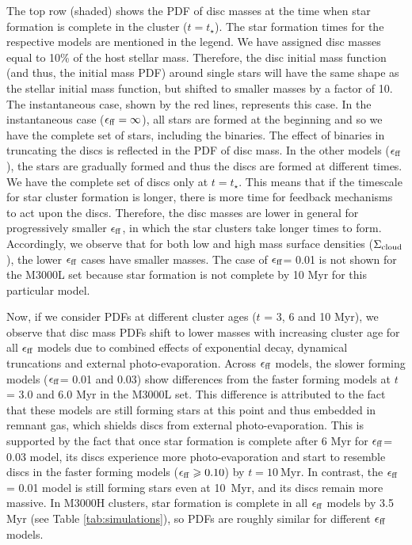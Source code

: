 \documentclass[fleqn,usenatbib]{mnras}
\newcommand\sfeff{\ensuremath{\epsilon_{\rm ff}}\xspace}   %
\newcommand\Sigmacloud{\ensuremath{\Sigma_{\rm cloud}}\xspace} %
\begin{document}
The top row (shaded) shows the PDF of disc masses at the time when star formation is complete in the cluster ($t=t_\star$). The star formation times for the respective models are mentioned in the legend. We have assigned disc masses equal to 10\% of the host stellar mass. Therefore, the disc initial mass function (and thus, the initial mass PDF) around single stars will have the same shape as the stellar initial mass function, but shifted to smaller masses by a factor of 10. The instantaneous case, shown by the red lines, 
represents this case. In the instantaneous case ($\sfeff = \infty$), all stars are formed at the beginning and so we have the complete set of stars, including the binaries. The effect of binaries in truncating the discs is reflected in the PDF of disc mass. In the other models (\sfeff), the stars are gradually formed and thus the discs are formed at different times. We have the complete set of discs only at $t = t_\star$. This means that if the timescale for star cluster formation is longer, there is more time for feedback mechanisms to act upon the discs. Therefore, the disc masses are lower in general for progressively smaller \sfeff, in which the star clusters take longer times to form.  Accordingly, we observe that for both low and high mass surface densities (\Sigmacloud), the lower \sfeff cases have smaller masses. The case of \sfeff = 0.01 is not shown for the M3000L set because star formation is not complete by 10 Myr for this particular model.  

Now, if we consider PDFs at different cluster ages ($t$ = 3, 6 and 10 Myr), we observe that disc mass PDFs shift to lower masses with increasing cluster age for all \sfeff models due to combined effects of exponential decay, dynamical truncations and external photo-evaporation. Across \sfeff models, the slower forming models (\sfeff = 0.01 and 0.03) show differences from the faster forming models at $t$ = 3.0 and 6.0 Myr in the M3000L set. This difference is attributed to the fact that these models are still forming stars at this point and thus embedded in remnant gas, which shields discs from external photo-evaporation. This is supported by the fact that once star formation is complete after 6 Myr for \sfeff = 0.03 model, its discs experience more photo-evaporation and start to resemble discs in the faster forming models ($\sfeff \geq 0.10$) by $t=10\:$Myr. In contrast, the \sfeff = 0.01 model is still forming stars even at 10~Myr, and its discs remain more massive. In M3000H clusters, star formation is complete in all \sfeff models by 3.5 Myr (see Table \ref{tab:simulations}), so PDFs are roughly similar for different \sfeff models. 
\end{document}
